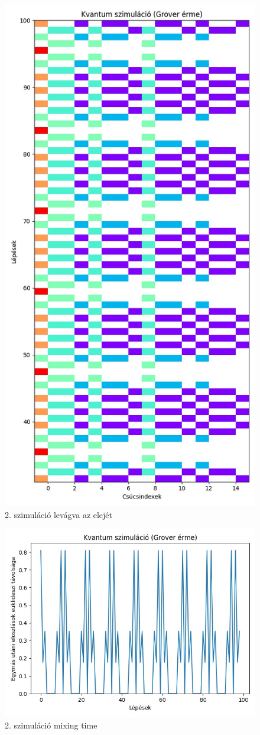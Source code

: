\documentclass[14pt,a4paper]{article}
\begin{document}
\begin{figure}[H]
\centering
\includegraphics[width = 0.7\columnwidth]{sim_02/counts_short.jpg}
\caption{2. szimuláció levágva az elejét}
\end{figure}
\begin{figure}[H]
\centering
\includegraphics[width = 0.7\columnwidth]{sim_02/mixing_time.jpg}
\caption{2. szimuláció mixing time}
\end{figure}
\end{document}
